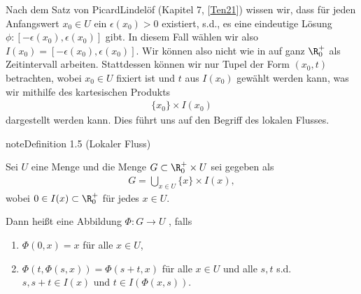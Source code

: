 \documentclass[letterpaper,10pt,english]{jupyterBook}
\begin{document}
Nach dem Satz von Picard\sphinxhyphen{}Lindelöf (Kapitel 7, {[}\hyperlink{cite.references:id7}{Ten21}{]}) wissen wir, dass für jeden Anfangswert \(x_0\in U\) ein \(\epsilon(x_0) >0\) existiert, s.d., es eine eindeutige Lösung \(\phi: [-\epsilon(x_0), \epsilon(x_0)]\) gibt. In diesem Fall wählen wir also \(I(x_0)=[-\epsilon(x_0), \epsilon(x_0)]\). Wir können also nicht wie in {\hyperref[\detokenize{ode/fluesse:def:Fluss}]{}} auf ganz \(\R^+_0\) als Zeitintervall arbeiten. Stattdessen können wir nur Tupel der Form \((x_0, t)\) betrachten, wobei \(x_0\in U\) fixiert ist und \(t\) aus \(I(x_0)\) gewählt werden kann, was wir mithilfe des kartesischen Produkts
\begin{align*}
\{x_0\}\times I(x_0)
\end{align*}
dargestellt werden kann. Dies führt uns auf den Begriff des lokalen Flusses.
\label{ode/fluesse:def:LokFluss}
\begin{sphinxadmonition}{note}{Definition 1.5 (Lokaler Fluss)}



Sei \(U\) eine Menge und die Menge \(G\subset \R^+_0\times U\) sei gegeben als
\begin{equation*}
\begin{split}G = \bigcup_{x\in U} \{x\}\times I(x),\end{split}
\end{equation*}
wobei \(0\in I(x)\subset \R^+_0\) für jedes \(x\in U\).

Dann heißt eine Abbildung \(\Phi: G\rightarrow U\) , falls
\begin{enumerate}
%
\item {} 
\(\Phi(0,x) = x\) für alle \(x\in U\),

\item {} 
\(\Phi(t, \Phi(s, x)) = \Phi(s+t, x)\) für alle \(x\in U\) und alle \(s,t\) s.d. \(s, s+t\in I(x)\) und \(t\in I(\Phi(x,s))\).

\end{enumerate}
\end{sphinxadmonition}
\end{document}
